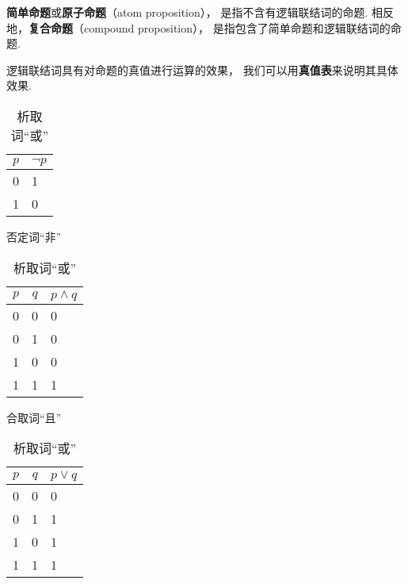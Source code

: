 \begin{definition}
\textbf{简单命题}或\textbf{原子命题}（atom proposition），%
是指不含有逻辑联结词的命题.
相反地，\textbf{复合命题}（compound proposition），%
是指包含了简单命题和逻辑联结词的命题.
\end{definition}

逻辑联结词具有对命题的真值进行运算的效果，%
我们可以用\textbf{真值表}来说明其具体效果.

\begin{table}[ht]
\centering
\begin{subtable}[ht]{0.9\textwidth}
\centering
\begin{tabular}{|c|p{1.5cm}|}
\hline
\(p\) & \(\neg p\) \\ \hline
0 & 1 \\ \hline
1 & 0 \\ \hline
\end{tabular}
\caption{否定词“非”}
\end{subtable}

\begin{subtable}[ht]{0.45\textwidth}
\centering
\begin{tabular}{|*{2}{c|}p{2cm}|}
\hline
\(p\) & \(q\) & \(p \land q\) \\ \hline
0 & 0 & 0 \\ \hline
0 & 1 & 0 \\ \hline
1 & 0 & 0 \\ \hline
1 & 1 & 1 \\ \hline
\end{tabular}
\caption{合取词“且”}
\end{subtable}
\begin{subtable}[ht]{0.45\textwidth}
\centering
\begin{tabular}{|*{2}{c|}p{2cm}|}
\hline
\(p\) & \(q\) & \(p \lor q\) \\ \hline
0 & 0 & 0 \\ \hline
0 & 1 & 1 \\ \hline
1 & 0 & 1 \\ \hline
1 & 1 & 1 \\ \hline
\end{tabular}
\caption{析取词“或”}
\end{subtable}


\end{table}
